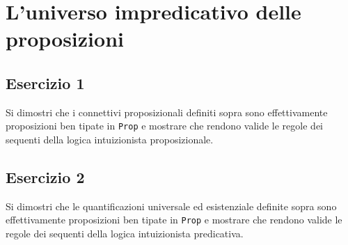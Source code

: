 \section{L'universo impredicativo delle proposizioni}
\subsection{Esercizio 1}
\begin{thm}
	Si dimostri che i connettivi proposizionali definiti sopra sono effettivamente proposizioni ben tipate in \texttt{Prop} e mostrare che rendono valide le regole dei sequenti della logica intuizionista proposizionale.
\end{thm}


\subsection{Esercizio 2}
\begin{thm}
	Si dimostri che le quantificazioni universale ed esistenziale definite sopra sono effettivamente proposizioni ben tipate in \texttt{Prop} e mostrare che rendono valide le regole dei sequenti della logica intuizionista predicativa.
\end{thm}
